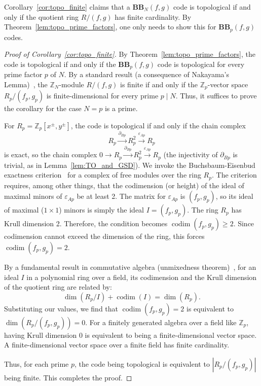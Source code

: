 \documentclass[aps,prb,english,superscriptaddress,twocolumn,tightenlines,showpacs,longbibliography,floatfix,amsfonts]{revtex4-2}
\begin{document}
Corollary~\ref{cor:topo_finite} claims that a $\mathbf{BB}_N(f,g)$ code is topological if and only if the quotient ring $R/(f,g)$ has finite cardinality. By Theorem~\ref{lem:topo_prime_factors}, one only needs to show this for $\mathbf{BB}_p(f,g)$ codes.

\begin{proof}[Proof of Corollary~\ref{cor:topo_finite}]
By Theorem~\ref{lem:topo_prime_factors}, the code is topological if and only if the $\mathbf{BB}_p(f,g)$ code is topological for every prime factor $p$ of $N$. By a standard result (a consequence of Nakayama's Lemma)~\cite{Eisenbud1995}, the $\mathbb{Z}_N$-module $R/(f,g)$ is finite if and only if the $\mathbb{Z}_p$-vector space $R_p/(f_p, g_p)$ is finite-dimensional for every prime $p\mid N$. Thus, it suffices to prove the corollary for the case $N=p$ is a prime.

For $R_p = \mathbb{Z}_p[x^{\pm}, y^{\pm}]$, the code is topological if and only if the chain complex
\begin{equation}
    R_p \xrightarrow{\partial_{Bp}} R_p^2 \xrightarrow{\varepsilon_{Ap}} R_p \label{eq:chain_complex_ptB}
\end{equation}
is exact, so the chain complex $0\to R_p \xrightarrow{\partial_{Bp}} R_p^2 \xrightarrow{\varepsilon_{Ap}} R_p$ (the injectivity of $\partial_{Bp}$ is trivial, as in Lemma~\ref{lem:TO_and_GSD}).
We invoke the Buchsbaum-Eisenbud exactness criterion~\cite{BUCHSBAUM1973} for a complex of free modules over the ring $R_p$. The criterion requires, among other things, that the codimension (or height) of the ideal of maximal minors of $\varepsilon_{Ap}$ be at least 2. The matrix for $\varepsilon_{Ap}$ is $(f_p, g_p)$, so its ideal of maximal ($1 \times 1$) minors is simply the ideal $I = (f_p, g_p)$.
The ring $R_p$ has Krull dimension 2. Therefore, the condition becomes $\operatorname{codim}(f_p, g_p) \ge 2$. Since codimension cannot exceed the dimension of the ring, this forces $\operatorname{codim}(f_p, g_p) = 2$.

By a fundamental result in commutative algebra (unmixedness theorem)~\cite{Eisenbud1995}, for an ideal $I$ in a polynomial ring over a field, its codimension and the Krull dimension of the quotient ring are related by:
\begin{equation}
    \dim(R_p/I) + \operatorname{codim}(I) = \dim(R_p).
\end{equation}
Substituting our values, we find that $\operatorname{codim}(f_p, g_p)=2$ is equivalent to $\dim(R_p/(f_p, g_p)) = 0$. For a finitely generated algebra over a field like $\mathbb{Z}_p$, having Krull dimension 0 is equivalent to being a finite-dimensional vector space. A finite-dimensional vector space over a finite field has finite cardinality.

Thus, for each prime $p$, the code being topological is equivalent to $|R_p/(f_p,g_p)|$ being finite. This completes the proof.
\end{proof}
\end{document}
